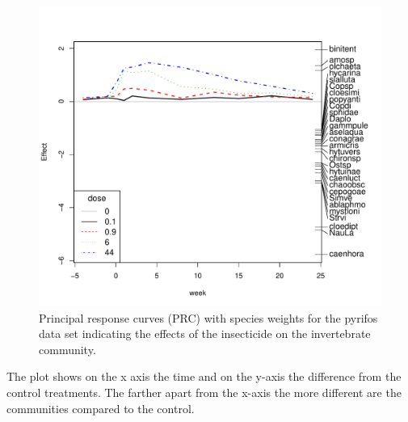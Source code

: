\documentclass{tufte-book}\usepackage{knitr}
\begin{document}
\begin{knitrout}
\color{fgcolor}\begin{kframe}
\begin{alltt}
  \hlstd{=} \hlopt{$} \hlopt{>} \hlstd{,}
     \hlstd{=} \hlstd{)}
\end{alltt}
\end{kframe}
\end{knitrout}


\begin{figure}
\begin{knitrout}
\color{fgcolor}

{\centering \includegraphics[width=\linewidth]{graphics/pyrifos_plot} 

}



\end{knitrout}

\caption{Principal response curves (PRC) with species weights for the pyrifos
data set indicating the effects of the insecticide on the invertebrate community.}
\end{figure}

The plot shows on the x axis the time and on the y-axis the difference from the 
control treatments. The farther apart from the x-axis the more different are the 
communities compared to the control.
\end{document}
